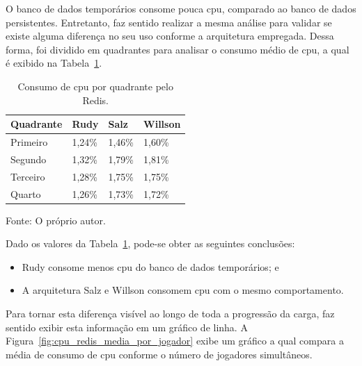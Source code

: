 O banco de dados temporários consome pouca \ac{cpu}, comparado ao banco de dados persistentes.
%
Entretanto, faz sentido realizar a mesma análise para validar se existe alguma diferença no seu uso conforme a arquitetura empregada.
%
Dessa forma, foi dividido em quadrantes para analisar o consumo médio de \ac{cpu}, a qual é exibido na Tabela~\ref{tab:cpu_redis_media_quadrantes}.

\begin{table}[htb!]
\centering
\begin{adjustbox}{max width=\textwidth}
\caption{Consumo de \ac{cpu} por quadrante pelo Redis.}
\label{tab:cpu_redis_media_quadrantes}
\begin{tabular}{|l|l|l|l|}

\hline

Quadrante & Rudy    & Salz    & Willson \\ \hline

Primeiro  & 1,24\% & 1,46\% & 1,60\% \\ \hline

Segundo   & 1,32\% & 1,79\% & 1,81\% \\ \hline

Terceiro  & 1,28\% & 1,75\% & 1,75\% \\ \hline

Quarto    & 1,26\% & 1,73\% & 1,72\% \\ \hline

\end{tabular}

\end{adjustbox}

Fonte: O próprio autor.
\end{table}

Dado os valores da Tabela~\ref{tab:cpu_redis_media_quadrantes}, pode-se obter as seguintes conclusões:

\begin{itemize}
 \item Rudy consome menos \ac{cpu} do banco de dados temporários; e
 \item A arquitetura Salz e Willson consomem \ac{cpu} com o mesmo comportamento.
\end{itemize}

Para tornar esta diferença visível ao longo de toda a progressão da carga, faz sentido exibir esta informação em um gráfico de linha.
%
A Figura~\ref{fig:cpu_redis_media_por_jogador} exibe um gráfico a qual compara a média de consumo de \ac{cpu} conforme o número de jogadores simultâneos.

